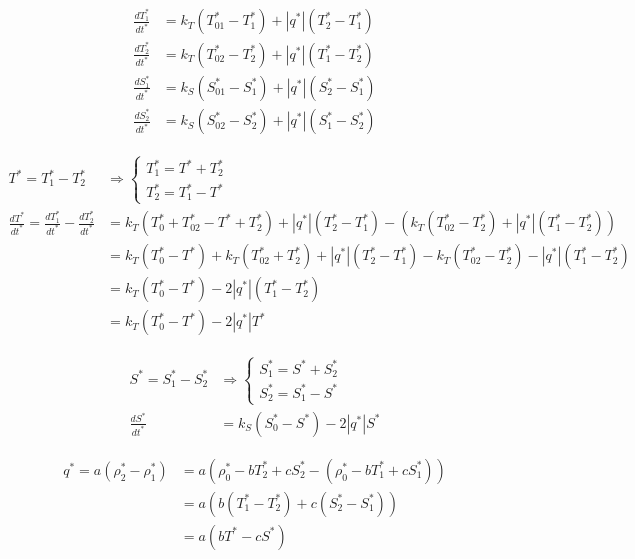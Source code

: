 \documentclass[11pt,a4paper]{article}
\begin{document}
	\begin{align*}
		\frac{dT^*_1}{dt^*} &= k_T\left(T^*_{01} - T^*_1\right) + \left|q^*\right|\left(T^*_2 - T^*_1\right) \\
		\frac{dT^*_2}{dt^*} &= k_T\left(T^*_{02} - T^*_2\right) + \left|q^*\right|\left(T^*_1 - T^*_2\right) \\
		\frac{dS^*_1}{dt^*} &= k_S\left(S^*_{01} - S^*_1\right) + \left|q^*\right|\left(S^*_2 - S^*_1\right) \\
		\frac{dS^*_2}{dt^*} &= k_S\left(S^*_{02} - S^*_2\right) + \left|q^*\right|\left(S^*_1 - S^*_2\right)
	\end{align*}
	
	\begin{align*}
		T^* = T^*_1 - T^*_2 &\Rightarrow \left\{
		\begin{array}{l}
			T^*_1 = T^* + T^*_2 \\
			T^*_2 = T^*_1 - T^*
		\end{array} \right. \\
		\frac{dT^*}{dt^*} = \frac{dT^*_1}{dt^*} - \frac{dT^*_2}{dt^*} &= 
		k_T\left(T^*_{0} + T^*_{02} - T^* + T^*_2 \right) + \left|q^*\right|\left(T^*_2 - T^*_1\right)  - \left( k_T\left(T^*_{02} - T^*_2\right) + \left|q^*\right|\left(T^*_1 - T^*_2\right) \right) \\
		&= k_T\left(T^*_{0} - T^*\right) + k_T\left(T^*_{02} + T^*_2\right) + \left|q^*\right|\left(T^*_2 - T^*_1\right) - k_T\left(T^*_{02} - T^*_2\right) - \left|q^*\right|\left(T^*_1 - T^*_2\right) \\
		&= k_T\left(T^*_{0} - T^*\right) - 2\left|q^*\right|\left(T^*_1 - T^*_2\right) \\
		&= k_T\left(T^*_{0} - T^*\right) - 2\left|q^*\right|T^*
	\end{align*}
	
	\begin{align*}
		S^* = S^*_1 - S^*_2 &\Rightarrow \left\{
		\begin{array}{l}
			S^*_1 = S^* + S^*_2 \\
			S^*_2 = S^*_1 - S^*
		\end{array} \right. \\
		\frac{dS^*}{dt^*} &= k_S\left(S^*_{0} - S^*\right) - 2\left|q^*\right|S^*
	\end{align*}
	
	\begin{align*}
		q^* = a\left( \rho^*_2 - \rho^*_1 \right) &=
		a \left( 
			\rho^*_0 - bT^*_2 + cS^*_2 -
			\left( \rho^*_0 - bT^*_1 + cS^*_1 \right)
		\right) \\
		&= a \left( b \left(T^*_1 - T^*_2\right) + c \left( S^*_2 - S^*_1 \right) \right) \\
		&= a \left( bT^* - cS^* \right)
	\end{align*}
	
\end{document}
